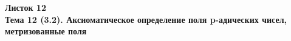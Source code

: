 \documentclass[a4paper, 11pt]{article}
\begin{document}
\begin{center} \Large \bf Листок 12\\ Тема 12 (3.2). Аксиоматическое определение поля p-адических чисел, метризованные поля \end{center}


\end{document}
